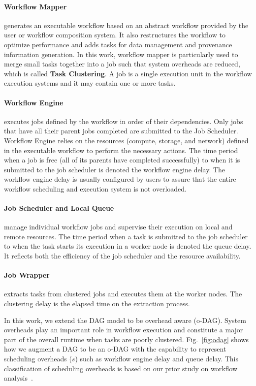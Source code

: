 \documentclass[final]{IEEEtran}
\begin{document}
\paragraph{Workflow Mapper} generates an executable workflow based on an abstract workflow provided by the user or workflow composition system. It also restructures the workflow to optimize performance and adds tasks for data management and provenance information generation. In this work, workflow mapper is particularly used to merge small tasks together into a job such that system overheads are reduced, which is called \textbf{Task Clustering}. A job is a single execution unit in the workflow execution systems and it may contain one or more tasks. 

\paragraph{Workflow Engine} executes jobs defined by the workflow in order of their dependencies. Only jobs that have all their parent jobs completed are submitted to the Job Scheduler. Workflow Engine relies on the resources (compute, storage, and network) defined in the executable workflow to perform the necessary actions. The time period when a job is free (all of its parents have completed successfully) to when it is submitted to the job scheduler is denoted the workflow engine delay. The workflow engine delay is usually configured by users to assure that the entire workflow scheduling and execution system is not overloaded. 

\paragraph{Job Scheduler and Local Queue} manage individual workflow jobs and supervise their execution on local and remote resources. The time period when a task is submitted to the job scheduler to when the task starts its execution in a worker node is denoted the queue delay. It reflects both the efficiency of the job scheduler and the resource availability. 

\paragraph{Job Wrapper} extracts tasks from clustered jobs and executes them at the worker nodes. The clustering delay is the  elapsed time on the extraction process.

In this work, we extend the DAG model to be overhead aware (o-DAG). System overheads play an important role in workflow execution and constitute a major part of the overall runtime when tasks are poorly clustered. Fig.~\ref{fig:odag} shows how we augment a DAG to be an o-DAG with the capability to represent scheduling overheads ($s$) such as workflow engine delay and queue delay. This classification of scheduling overheads is based on our prior study on workflow analysis~\cite{Chen}. 
\end{document}
